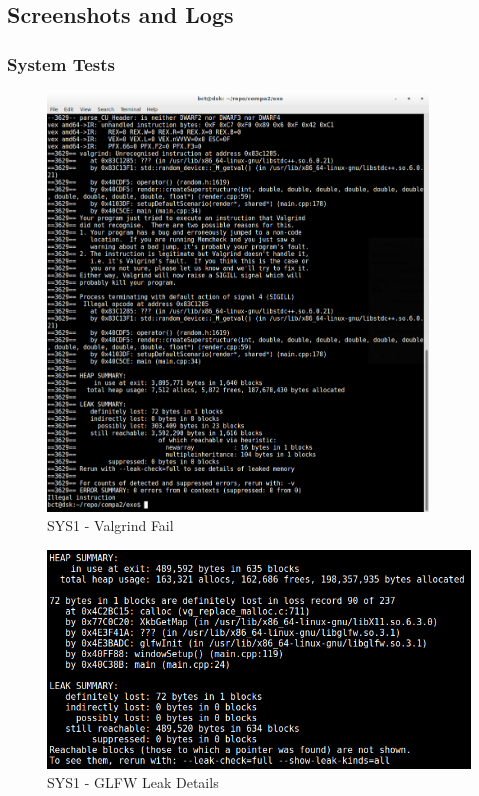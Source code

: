 \subsection{Screenshots and Logs}
\subsubsection{System Tests}
\begin{figure}[h]
  \centering
  \includegraphics[width=0.9\textwidth]{img/testingEvidence/sys1rdcrash.png}
  \caption{SYS1 - Valgrind Fail}
\end{figure}
\begin{figure}[H]
  \centering
  \includegraphics[width=\textwidth]{img/testingEvidence/glfwleak.png}
  \caption{SYS1 - GLFW Leak Details}
\end{figure}
